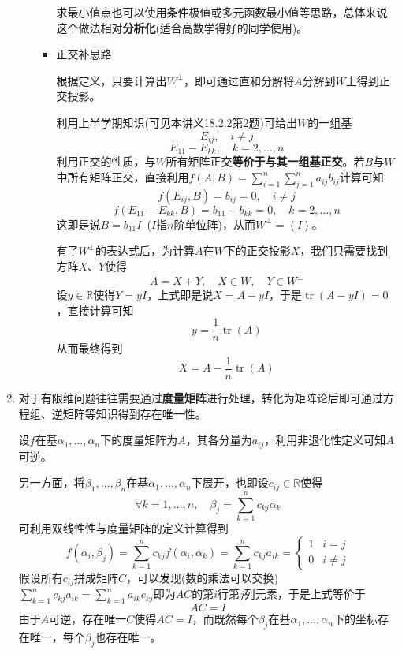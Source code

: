 \documentclass[a4paper,UTF8,fontset=windows,AutoFakeBold]{ctexart}
\DeclareMathOperator{\tr}{tr}
\newcommand*{\note}{\noindent *}
\begin{document}
\begin{enumerate}
\begin{enumerate}
\begin{itemize}
            \note 求最小值点也可以使用条件极值或多元函数最小值等思路，总体来说这个做法相对\textbf{分析化}(\sout{适合高数学得好的同学使用})。

            \item 正交补思路
            
            根据定义，只要计算出$W^\bot$，即可通过直和分解将$A$分解到$W$上得到正交投影。

            利用上半学期知识(可见本讲义18.2.2第2题)可给出$W$的一组基
            $$E_{ij},\quad i\ne j$$
            $$E_{11}-E_{kk},\quad k=2,\dots,n$$
            利用正交的性质，与$W$所有矩阵正交\textbf{等价于与其一组基正交}。若$B$与$W$中所有矩阵正交，直接利用$f(A,B)=\sum_{i=1}^n\sum_{j=1}^na_{ij}b_{ij}$计算可知
            $$f(E_{ij},B)=b_{ij}=0,\quad i\ne j$$
            $$f(E_{11}-E_{kk},B)=b_{11}-b_{kk}=0,\quad k=2,\dots,n$$
            这即是说$B=b_{11}I$\ ($I$指$n$阶单位阵)，从而$W^\bot=\left<I\right>$。

            有了$W^\bot$的表达式后，为计算$A$在$W$下的正交投影$X$，我们只需要找到方阵$X$、$Y$使得
            $$A=X+Y,\quad X\in W,\quad Y\in W^\bot$$
            设$y\in\mathbb{R}$使得$Y=yI$，上式即是说$X=A-yI$，于是$\tr(A-yI)=0$，直接计算可知
            $$y=\frac{1}{n}\tr(A)$$
            从而最终得到
            $$X=A-\frac{1}{n}\tr(A)$$
        \end{itemize}
    \end{enumerate}

    \item
    \note 对于有限维问题往往需要通过\textbf{度量矩阵}进行处理，转化为矩阵论后即可通过方程组、逆矩阵等知识得到存在唯一性。

    设$f$在基$\alpha_1,\dots,\alpha_n$下的度量矩阵为$A$，其各分量为$a_{ij}$，利用非退化性定义可知$A$可逆。

    另一方面，将$\beta_1,\dots,\beta_n$在基$\alpha_1,\dots,\alpha_n$下展开，也即设$c_{ij}\in\mathbb{R}$使得
    $$\forall k=1,\dots,n,\quad\beta_j=\sum_{k=1}^nc_{kj}\alpha_k$$
    可利用双线性性与度量矩阵的定义计算得到
    $$f(\alpha_i,\beta_j)=\sum_{k=1}^nc_{kj}f(\alpha_i,\alpha_k)=\sum_{k=1}^nc_{kj}a_{ik}=\begin{cases}1&i=j\\0&i\ne j\end{cases}$$
    假设所有$c_{ij}$拼成矩阵$C$，可以发现(数的乘法可以交换)\ $\sum_{k=1}^nc_{kj}a_{ik}=\sum_{k=1}^na_{ik}c_{kj}$即为$AC$的第$i$行第$j$列元素，于是上式等价于
    $$AC=I$$
    由于$A$可逆，存在唯一$C$使得$AC=I$，而既然每个$\beta_j$在基$\alpha_1,\dots,\alpha_n$下的坐标存在唯一，每个$\beta_j$也存在唯一。


\end{enumerate}
\end{document}
